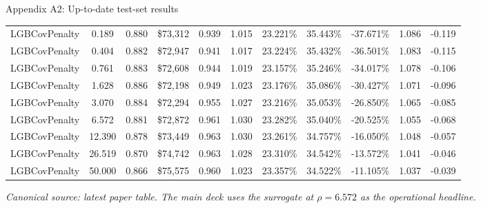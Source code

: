 \documentclass[aspectratio=169,10pt]{beamer}
\newcommand{\smallnote}[1]{{\footnotesize\itshape\textcolor{Mid}{#1}}}
\begin{document}
\begin{frame}{Appendix A2: Up-to-date test-set results}
\begin{center}
{\begin{tabular}{lc|cc|cc|cc|ccc}
LGBCovPenalty & 0.189 & 0.880 & \$73{,}312 & 0.939 & 1.015 & 23.221\% & 35.443\% & -37.671\% & 1.086 & -0.119 \\
LGBCovPenalty & 0.404 & 0.882 & \$72{,}947 & 0.941 & 1.017 & 23.224\% & 35.432\% & -36.501\% & 1.083 & -0.115 \\
LGBCovPenalty & 0.761 & 0.883 & \$72{,}608 & 0.944 & 1.019 & 23.157\% & 35.246\% & -34.017\% & 1.078 & -0.106 \\
LGBCovPenalty & 1.628 & 0.886 & \$72{,}198 & 0.949 & 1.023 & 23.176\% & 35.086\% & -30.427\% & 1.071 & -0.096 \\
LGBCovPenalty & 3.070 & 0.884 & \$72{,}294 & 0.955 & 1.027 & 23.216\% & 35.053\% & -26.850\% & 1.065 & -0.085 \\
LGBCovPenalty & 6.572 & 0.881 & \$72{,}872 & 0.961 & 1.030 & 23.282\% & 35.040\% & -20.525\% & 1.055 & -0.068 \\
LGBCovPenalty & 12.390 & 0.878 & \$73{,}449 & 0.963 & 1.030 & 23.261\% & 34.757\% & -16.050\% & 1.048 & -0.057 \\
LGBCovPenalty & 26.519 & 0.870 & \$74{,}742 & 0.963 & 1.028 & 23.310\% & 34.542\% & -13.572\% & 1.041 & -0.046 \\
LGBCovPenalty & 50.000 & 0.866 & \$75{,}575 & 0.960 & 1.023 & 23.357\% & 34.522\% & -11.105\% & 1.037 & -0.039 \\
\bottomrule
\end{tabular}}
\end{center}
\smallnote{Canonical source: latest paper table. The main deck uses the surrogate at $\rho=6.572$ as the operational headline.}
\end{frame}
\end{document}
